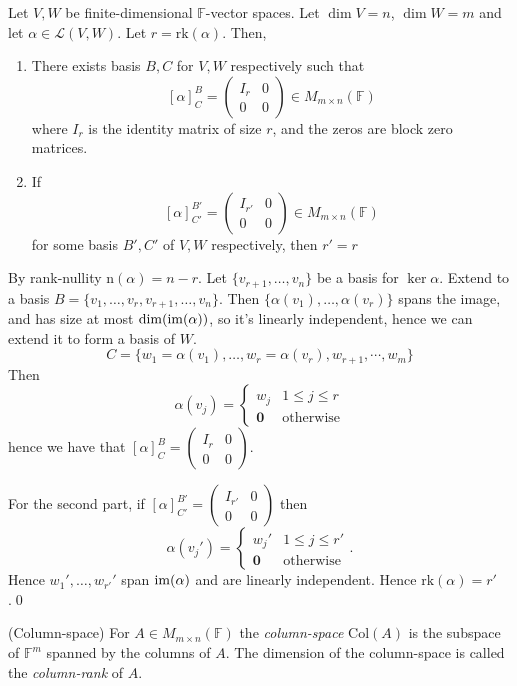 \documentclass{article}
\newcommand{\F}{\mathbb{F}}
\newcommand{\n}{\mathrm{n}}
\newcommand{\rk}{\mathrm{rk}}
\newcommand{\Col}{\mathrm{Col}}
\begin{document}
\begin{theorem}
  Let $ V,W $ be finite-dimensional $ \F $-vector spaces. Let $ \dim V=n $, $ \dim W=m $ and let $ \alpha\in\mathcal L(V,W) $. Let $ r=\rk(\alpha) $. Then,
  \begin{enumerate}
	  \item There exists basis $ B,C $ for $ V,W $ respectively such that
		  \[
			  [\alpha]^B_C=\begin{pmatrix}
				  I_r & 0 \\
				  0 & 0
			  \end{pmatrix}\in M_{m\times n}(\F)
		  \]
		  where $ I_r $ is the identity matrix of size $ r $, and the zeros are block zero matrices.
	  \item If \[
			  [\alpha]^{B'}_{C'}=\begin{pmatrix}
				  I_{r'} & 0 \\
				  0 & 0
			  \end{pmatrix}\in M_{m\times n}(\F)
		  \]
		  for some basis $ B',C'$ of $ V,W $ respectively, then $ r'=r $
  \end{enumerate}
\end{theorem}
\pf By rank-nullity $ \n(\alpha)=n-r $. Let $ \{v_{r+1},\dots, v_n\} $ be a basis for $ \ker\alpha $. Extend to a basis $ B=\{v_1,\dots, v_r,v_{r+1},\dots, v_n\} $. Then $ \{\alpha(v_1),\dots, \alpha(v_r)\} $ spans the image, and has size at most $ \dim(\operatorname{im}(\alpha)) $, so it's linearly independent, hence we can extend it to form a basis of $ W $.
\[
	C=\{w_1=\alpha(v_1),\dots, w_r=\alpha(v_r),w_{r+1},\cdots, w_m\}
\]
Then
\[
  \alpha(v_j)=\begin{cases}
	  w_j & 1\le j\le r \\
	  \mathbf 0 & \text{otherwise}
  \end{cases}
\]
hence we have that $ [\alpha]^B_C= \begin{pmatrix}
				  I_{r} & 0 \\
				  0 & 0
			  \end{pmatrix} $.\par
			  For the second part, if $ [\alpha]^{B'}_{C'}= \begin{pmatrix}
				  I_{r'} & 0 \\
				  0 & 0
			  \end{pmatrix} $ then
			  \[
			    \alpha(v_j')=\begin{cases}
	  w_j' & 1\le j\le r' \\
	  \mathbf 0 & \text{otherwise}
  \end{cases}.


			  \]
			  Hence $ w_1',\dots, w_{r'}' $ span $ \operatorname{im}(\alpha) $ and are linearly independent. Hence $ \rk(\alpha)=r' $.\qed
\begin{definition}
	(Column-space) For $ A\in M_{m\times n}(\F) $ the \textit{column-space} $ \Col(A) $ is the subspace of $ \F^m $ spanned by the columns of $ A $. The dimension of the column-space is called the \textit{column-rank} of $ A $.
\end{definition}
\end{document}

